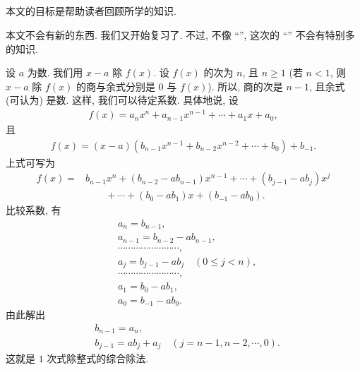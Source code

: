 \subsection*{}

本文的目标是帮助读者回顾所学的知识.

本文不会有新的东西. 我们又开始复习了. 不过, 不像 ``'', 这次的 ``'' 不会有特别多的知识.

\begin{proposition}
    设 $a$ 为数. 我们用 $x-a$ 除 $f(x)$. 设 $f(x)$ 的次为 $n$, 且 $n \geq 1$ (若 $n < 1$, 则 $x-a$ 除 $f(x)$ 的商与余式分别是 $0$ 与 $f(x)$). 所以, 商的次是 $n-1$, 且余式 (可认为) 是数. 这样, 我们可以待定系数. 具体地说, 设
    \begin{align*}
        f(x) = a_n x^n + a_{n-1} x^{n-1} + \cdots + a_1 x + a_0,
    \end{align*}
    且
    \begin{align*}
        f(x) = (x - a) (b_{n-1} x^{n-1} + b_{n-2} x^{n-2} + \cdots + b_0) + b_{-1}.
    \end{align*}
    上式可写为
    \begin{align*}
        f(x)
        = {} & b_{n-1} x^n + (b_{n-2} - ab_{n-1}) x^{n-1} + \cdots + (b_{j-1} - ab_j) x^j \\
             & \qquad + \cdots + (b_0 - ab_1) x + (b_{-1} - ab_0).
    \end{align*}
    比较系数, 有
    \begin{align*}
         & a_n = b_{n-1},                                           \\
         & a_{n-1} = b_{n-2} - ab_{n-1},                            \\
         & \cdots \cdots \cdots \cdots \cdots \cdots \cdots \cdots, \\
         & a_j = b_{j-1} - ab_j \quad (0 \leq j < n),               \\
         & \cdots \cdots \cdots \cdots \cdots \cdots \cdots \cdots, \\
         & a_1 = b_0 - ab_1,                                        \\
         & a_0 = b_{-1} - ab_0.
    \end{align*}
    由此解出
    \begin{align*}
         & b_{n-1} = a_n,                                     \\
         & b_{j-1} = ab_j + a_j \quad (j = n-1,n-2,\cdots,0).
    \end{align*}
    这就是 $1$ 次式除整式的综合除法.
\end{proposition}

